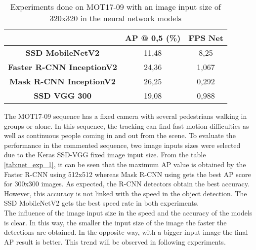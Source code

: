 \begin{table}[H]
\tiny
\begin{center}
\begin{tabular}{|c|c|c|}
\hline
\textbf{}                         & \textbf{AP @ 0,5 (\%)} & \textbf{FPS Net} \\ \hline
\textbf{SSD MobileNetV2}          & 11,48                  & 8,25             \\ \hline
\textbf{Faster R-CNN InceptionV2} & 24,36                  & 1,067            \\ \hline
\textbf{Mask R-CNN InceptionV2}   & 26,25                  & 0,292            \\ \hline
\textbf{SSD VGG 300}              & 19,08                  & 0,988            \\ \hline
\end{tabular}
\end{center}
\caption{Experiments done on MOT17-09 with an image input size of 320x320 in the neural network models}
\label{tab:net_exp_2}
\end{table}
The MOT17-09 sequence has a fixed camera with several pedestrians walking in groups or alone. In this sequence, the tracking can find fast motion difficulties as well as continuous people coming in and out from the scene. To evaluate the performance in the commented sequence, two image inputs sizes were selected due to the Keras SSD-VGG fixed image input size. From the table \ref{tab:net_exp_1}, it can be seen that the maximum AP value is obtained by the Faster R-CNN using 512x512 whereas Mask R-CNN using gets the best AP score for 300x300 images. As expected, the R-CNN detectors obtain the best accuracy. However, this accuracy is not linked with the speed in the object detection. The SSD MobileNetV2 gets the best speed rate in both experiments.\\
The influence of the image input size in the speed and the accuracy of the models is clear. In this way, the smaller the input size of the image the faster the detections are obtained. In the opposite way, with a bigger input image the final AP result is better. This trend will be observed in following experiments.\\

